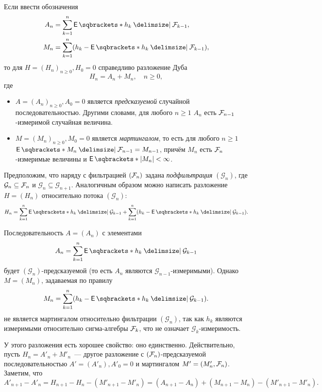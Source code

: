 Если ввести обозначения
\begin{align*}
	A_{n} &= \sum_{k = 1}^{n} \E{h_{k} \given \F_{k - 1}}, \\
	M_{n} &= \sum_{k = 1}^{n} (h_{k} - \E{h_{k} \given \F_{k - 1}}),
\end{align*}
то для \(H = (H_{n})_{n \geq 0}, H_{0} = 0\) справедливо разложение Дуба
\[
	H_{n} = A_{n} + M_{n}, \quad n \geq 0,
\]
где
\begin{itemize}
	\item \(A = (A_{n})_{n \geq 0}, A_{0} = 0\) является \emph{предсказуемой} 
	случайной последовательностью. Другими словами, для любого \(n \geq 1\) 
	\(A_{n}\) есть \(\mathcal{F}_{n - 1}\)-измеримой случайная величина.
	\item \(M = (M_{n})_{n \geq 0}, M_{0} = 0\) является \emph{мартингалом}, то 
	есть для любого \(n \geq 1\) \(\E{M_{n} \given \F_{n - 1}} = M_{n - 1}\), 
	причём \(M_{n}\) есть \(\mathcal{F}_{n}\)-измеримые величины и \(\E{|M_{n}|} < 
	\infty\).
\end{itemize}
\begin{remark}
	Предположим, что наряду с фильтрацией \((\mathcal{F}_{n})\) задана 
	\emph{подфильтрация} \((\mathcal{G}_{n})\), где \(\mathcal{G}_{n} \subseteq 
	\mathcal{F}_{n}\) и \(\mathcal{G}_{n} \subseteq \mathcal{G}_{n + 1}\). Аналогичным 
	образом можно написать разложение \(H = (H_{n})\) относительно потока 
	\((\mathcal{G}_{n})\):
	\[
		H_{n} = \sum_{k = 1}^{n} \E{h_{k} \given \mathcal{G}_{k - 1}} + \sum_{k 
		= 1}^{n} (h_{k} - \E{h_{k} \given \mathcal{G}_{k - 1}}).
	\]
	
	Последовательность \(A = (A_{n})\) с элементами
	\[
		A_{n} = \sum_{k = 1}^{n} \E{h_{k} \given \mathcal{G}_{k - 1}}
	\]
	будет \((\mathcal{G}_{n})\)-предсказуемой (то есть \(A_{n}\) являются
	\(\mathcal{G}_{n - 1}\)-измеримыми). Однако \(M = (M_{n})\), задаваемая по 
	правилу
	\[
		M_{n} = \sum_{k = 1}^{n} (h_{k} - \E{h_{k} \given \mathcal{G}_{k - 1}}).
	\]
	не является мартингалом относительно фильтрации \((\mathcal{G}_{n})\), так 
	как \(h_{k}\) являются измеримыми относительно сигма-алгебры \(\mathcal{F}_{k}\), 
	что не означает \(\mathcal{G}_{k}\)-измеримость.
\end{remark}

У этого разложения есть хорошее свойство: оно единственно. Действительно, пусть 
\(H_{n} = A'_{n} + M'_{n}\)~--- другое разложение с \((\mathcal{F}_{n})\)-предсказуемой 
последовательностью \(A' = (A'_{n}), A'_{0} = 0\) и мартингалом \(M' = (M'_{n}, 
\mathcal{F}_{n})\). Заметим, что
\[
	A'_{n + 1} - A'_{n} = H_{n + 1} - H_{n} - (M'_{n + 1} - M'_{n}) = (A_{n + 
	1} - A_{n}) + (M_{n + 1} - M_{n}) - (M'_{n + 1} - M'_{n}).
\]

